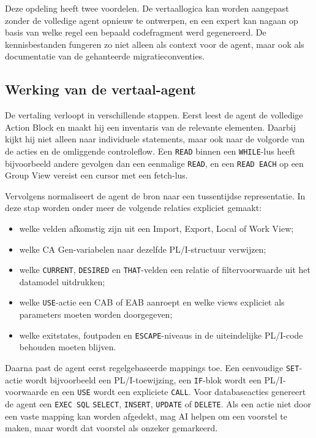 Deze opdeling heeft twee voordelen. De vertaallogica kan worden aangepast
zonder de volledige agent opnieuw te ontwerpen, en een expert kan nagaan op
basis van welke regel een bepaald codefragment werd gegenereerd. De
kennisbestanden fungeren zo niet alleen als context voor de agent, maar ook als
documentatie van de gehanteerde migratieconventies.

\subsection{Werking van de vertaal-agent}
\label{sec:werking-vertaal-agent}

De vertaling verloopt in verschillende stappen. Eerst leest de agent de
volledige Action Block en maakt hij een inventaris van de relevante elementen.
Daarbij kijkt hij niet alleen naar individuele statements, maar ook naar de
volgorde van de acties en de omliggende controleflow. Een \texttt{READ} binnen
een \texttt{WHILE}-lus heeft bijvoorbeeld andere gevolgen dan een eenmalige
\texttt{READ}, en een \texttt{READ EACH} op een Group View vereist een cursor
met een fetch-lus.

Vervolgens normaliseert de agent de bron naar een tussentijdse representatie.
In deze stap worden onder meer de volgende relaties expliciet gemaakt:
\begin{itemize}
    \item welke velden afkomstig zijn uit een Import, Export, Local of Work
    View;
    \item welke CA Gen-variabelen naar dezelfde PL/I-structuur verwijzen;
    \item welke \texttt{CURRENT}, \texttt{DESIRED} en \texttt{THAT}-velden
    een relatie of filtervoorwaarde uit het datamodel uitdrukken;
    \item welke \texttt{USE}-actie een CAB of EAB aanroept en welke views
    expliciet als parameters moeten worden doorgegeven;
    \item welke exitstates, foutpaden en \texttt{ESCAPE}-niveaus in de
    uiteindelijke PL/I-code behouden moeten blijven.
\end{itemize}

Daarna past de agent eerst regelgebaseerde mappings toe. Een eenvoudige
\texttt{SET}-actie wordt bijvoorbeeld een PL/I-toewijzing, een \texttt{IF}-blok
wordt een PL/I-voorwaarde en een \texttt{USE} wordt een expliciete
\texttt{CALL}. Voor databaseacties genereert de agent een \texttt{EXEC SQL}
\texttt{SELECT}, \texttt{INSERT}, \texttt{UPDATE} of \texttt{DELETE}. Als een
actie niet door een vaste mapping kan worden afgedekt, mag AI helpen om een
voorstel te maken, maar wordt dat voorstel als onzeker gemarkeerd.


